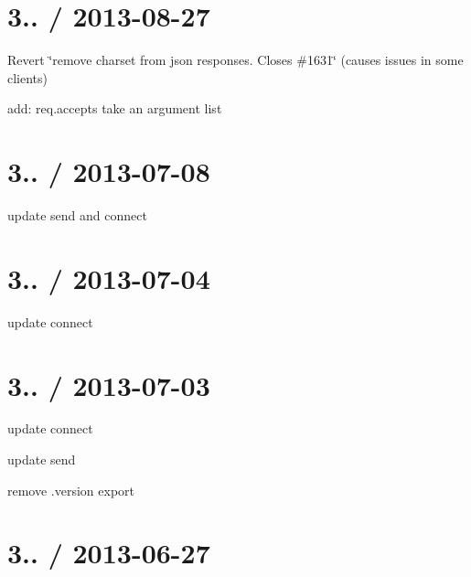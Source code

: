 {\ttfamily \section*{3.. / 2013-\/08-\/27 }}

{\ttfamily }

{\ttfamily 
\begin{DoxyItemize}
\item Revert \char`\"{}remove charset from json responses. Closes \#1631\char`\"{} (causes issues in some clients)
\item add\+: req.\+accepts take an argument list
\end{DoxyItemize}}

{\ttfamily \section*{3.. / 2013-\/07-\/08 }}

{\ttfamily }

{\ttfamily 
\begin{DoxyItemize}
\item update send and connect
\end{DoxyItemize}}

{\ttfamily \section*{3.. / 2013-\/07-\/04 }}

{\ttfamily }

{\ttfamily 
\begin{DoxyItemize}
\item update connect
\end{DoxyItemize}}

{\ttfamily \section*{3.. / 2013-\/07-\/03 }}

{\ttfamily }

{\ttfamily 
\begin{DoxyItemize}
\item update connect
\item update send
\item remove .version export
\end{DoxyItemize}}

{\ttfamily \section*{3.. / 2013-\/06-\/27 }}

